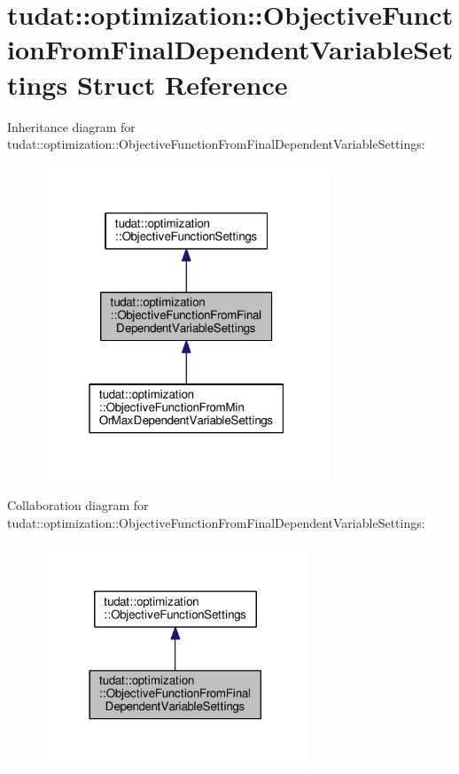 \hypertarget{structtudat_1_1optimization_1_1ObjectiveFunctionFromFinalDependentVariableSettings}{}\section{tudat\+:\+:optimization\+:\+:Objective\+Function\+From\+Final\+Dependent\+Variable\+Settings Struct Reference}
\label{structtudat_1_1optimization_1_1ObjectiveFunctionFromFinalDependentVariableSettings}


Inheritance diagram for tudat\+:\+:optimization\+:\+:Objective\+Function\+From\+Final\+Dependent\+Variable\+Settings\+:
\nopagebreak
\begin{figure}[H]
\begin{center}
\leavevmode
\includegraphics[width=244pt]{structtudat_1_1optimization_1_1ObjectiveFunctionFromFinalDependentVariableSettings__inherit__graph}
\end{center}
\end{figure}


Collaboration diagram for tudat\+:\+:optimization\+:\+:Objective\+Function\+From\+Final\+Dependent\+Variable\+Settings\+:
\nopagebreak
\begin{figure}[H]
\begin{center}
\leavevmode
\includegraphics[width=225pt]{structtudat_1_1optimization_1_1ObjectiveFunctionFromFinalDependentVariableSettings__coll__graph}
\end{center}
\end{figure}

